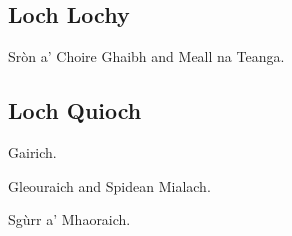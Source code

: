 \subsection{Loch Lochy}

\begin{munros}
\item
Sròn a' Choire Ghaibh and Meall na Teanga.  \tick
\end{munros}


\subsection{Loch Quioch}

\begin{munros}
\item
Gairich.

\item
Gleouraich and Spidean Mialach.  \tick

\item
Sgùrr a' Mhaoraich.
\end{munros}

